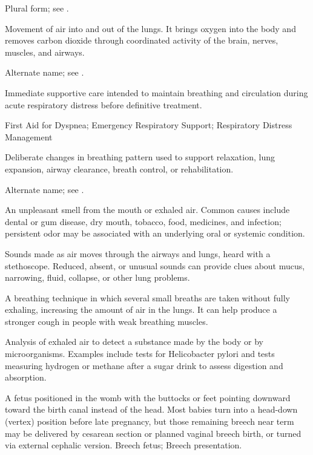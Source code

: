  Plural form; see .

 Movement of air into and out of the lungs. It brings oxygen into the body and removes carbon dioxide through coordinated activity of the brain, nerves, muscles, and airways.

 Alternate name; see .

 Immediate supportive care intended to maintain breathing and circulation during acute respiratory distress before definitive treatment.

\synonyms
First Aid for Dyspnea; Emergency Respiratory Support; Respiratory Distress Management

 Deliberate changes in breathing pattern used to support relaxation, lung expansion, airway clearance, breath control, or rehabilitation.

 Alternate name; see .

 An unpleasant smell from the mouth or exhaled air. Common causes include dental or gum disease, dry mouth, tobacco, food, medicines, and infection; persistent odor may be associated with an underlying oral or systemic condition.

 Sounds made as air moves through the airways and lungs, heard with a stethoscope. Reduced, absent, or unusual sounds can provide clues about mucus, narrowing, fluid, collapse, or other lung problems.

 A breathing technique in which several small breaths are taken without fully exhaling, increasing the amount of air in the lungs. It can help produce a stronger cough in people with weak breathing muscles.

 Analysis of exhaled air to detect a substance made by the body or by microorganisms. Examples include tests for Helicobacter pylori and tests measuring hydrogen or methane after a sugar drink to assess digestion and absorption.

 A fetus positioned in the womb with the buttocks or feet pointing downward toward the birth canal instead of the head. Most babies turn into a head-down (vertex) position before late pregnancy, but those remaining breech near term may be delivered by cesarean section or planned vaginal breech birth, or turned via external cephalic version.
\synonyms Breech fetus; Breech presentation.

